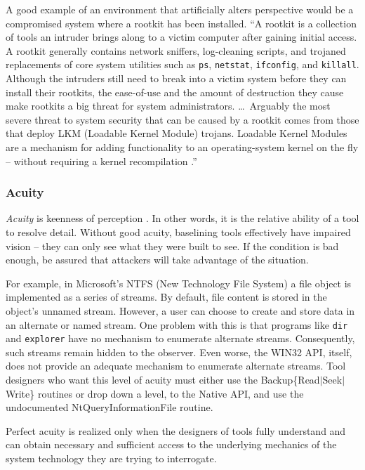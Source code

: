 \documentclass[10pt]{article}
\begin{document}
A good example of an environment that artificially alters perspective
would be a compromised system where a rootkit has been installed.  ``A
rootkit is a collection of tools an intruder brings along to a victim
computer after gaining initial access.  A rootkit generally contains
network sniffers, log-cleaning scripts, and trojaned replacements of
core system utilities such as \texttt{ps}, \texttt{netstat},
\texttt{ifconfig}, and \texttt{killall}.  Although the intruders still
need to break into a victim system before they can install their
rootkits, the ease-of-use and the amount of destruction they cause
make rootkits a big threat for system administrators. \ldots\ Arguably
the most severe threat to system security that can be caused by a
rootkit comes from those that deploy LKM (Loadable Kernel Module)
trojans.  Loadable Kernel Modules are a mechanism for adding
functionality to an operating-system kernel on the fly -- without
requiring a kernel recompilation \cite{rootkit}.''

\subsubsection{Acuity}

{\it Acuity} is keenness of perception \cite{dictionary}.  In other
words, it is the relative ability of a tool to resolve detail.
Without good acuity, baselining tools effectively have impaired vision
-- they can only see what they were built to see.  If the condition is
bad enough, be assured that attackers will take advantage of the
situation.

For example, in Microsoft's NTFS (New Technology File System) a file
object is implemented as a series of streams.  By default, file
content is stored in the object's unnamed stream.  However, a user can
choose to create and store data in an alternate or named stream.  One
problem with this is that programs like \texttt{dir} and
\texttt{explorer} have no mechanism to enumerate alternate streams.
Consequently, such streams remain hidden to the observer.  Even worse,
the WIN32 API, itself, does not provide an adequate mechanism to
enumerate alternate streams.  Tool designers who want this level of
acuity must either use the Backup\{Read$\mid$Seek$\mid$Write\}
routines or drop down a level, to the Native API, and use the
undocumented NtQueryInformationFile routine.

Perfect acuity is realized only when the designers of tools fully
understand and can obtain necessary and sufficient access to the
underlying mechanics of the system technology they are trying to
interrogate.
\end{document}
